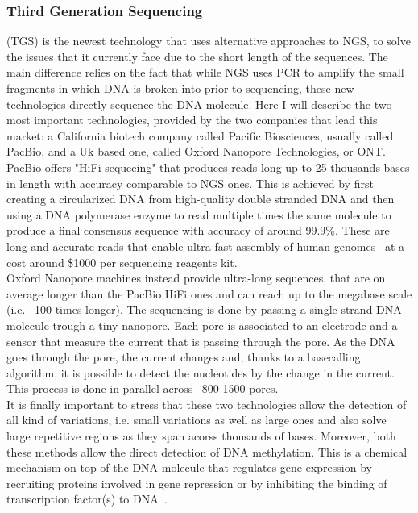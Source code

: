 \subsubsection*{Third Generation Sequencing} (TGS) is the newest technology that uses alternative approaches to NGS, to solve the issues that it currently face due to the short length of the sequences. The main difference relies on the fact that while NGS uses PCR to amplify the small fragments in which DNA is broken into prior to sequencing, these new technologies directly sequence the DNA molecule. Here I will describe the two most important technologies, provided by the two companies that lead this market: a California biotech company called Pacific Biosciences, usually called PacBio, and a Uk based one, called Oxford Nanopore Technologies, or ONT.\\
PacBio offers "HiFi sequecing" that produces reads long up to 25 thousands bases in length with accuracy comparable to NGS ones. This is achieved by first creating a circularized DNA from high-quality double stranded DNA and then using a DNA polymerase enzyme to read multiple times the same molecule to produce a final consensus sequence with accuracy of around 99.9\%. These are long and accurate reads that enable ultra-fast assembly of human genomes~\cite{mdbg} at a cost around \$1000 per sequencing reagents kit. \\
Oxford Nanopore machines instead provide ultra-long sequences, that are on average longer than the PacBio HiFi ones and can reach up to the megabase scale (i.e. ~100 times longer). The sequencing is done by passing a single-strand DNA molecule trough a tiny nanopore. Each pore is associated to an electrode and a sensor that measure the current that is passing through the pore. As the DNA goes through the pore, the current changes and, thanks to a basecalling algorithm, it is possible to detect the nucleotides by the change in the current. This process is done in parallel across ~800-1500 pores.\\
It is finally important to stress that these two technologies allow the detection of all kind of variations, i.e. small variations as well as large ones and also solve large repetitive regions as they span acorss thousands of bases. Moreover, both these methods allow the direct detection of DNA methylation. This is a chemical mechanism on top of the DNA molecule that regulates gene expression  by recruiting proteins involved in gene repression or by inhibiting the binding of transcription factor(s) to DNA~\cite{methylation}. \\

